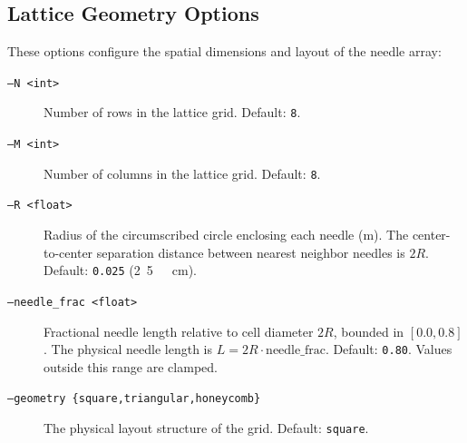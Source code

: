 \documentclass[11pt,a4paper]{article}
\newcommand{\code}[1]{\texttt{#1}}
\begin{document}
\subsection{Lattice Geometry Options}
These options configure the spatial dimensions and layout of the needle array:
\begin{description}
    \item[\code{--N <int>}] Number of rows in the lattice grid. Default: \code{8}.
    \item[\code{--M <int>}] Number of columns in the lattice grid. Default: \code{8}.
    \item[\code{--R <float>}] Radius of the circumscribed circle enclosing each needle (\si{m}). The center-to-center separation distance between nearest neighbor needles is $2R$. Default: \code{0.025} (\si{2.5\ cm}).
    \item[\code{--needle\_frac <float>}] Fractional needle length relative to cell diameter $2R$, bounded in $[0.0, 0.8]$. The physical needle length is $L = 2R \cdot \text{needle\_frac}$. Default: \code{0.80}. Values outside this range are clamped.
    \item[\code{--geometry \{square,triangular,honeycomb\}}] The physical layout structure of the grid. Default: \code{square}.
\end{description}
\end{document}
